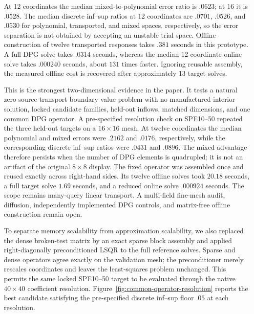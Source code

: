 \documentclass[11pt]{article}
\numberwithin{algorithm}{section}
\theoremstyle{definition}\newtheorem{definition}[theorem]{Definition}
\theoremstyle{remark}\newtheorem{remark}[theorem]{Remark}
\begin{document}
At 12 coordinates the median mixed-to-polynomial error ratio is $.0623$; at
16 it is $.0528$.  The median discrete inf--sup ratios at 12 coordinates are
$.0701$, $.0526$, and $.0530$ for polynomial, transported, and mixed spaces,
respectively, so the error separation is not obtained by accepting an unstable
trial space.  Offline construction of twelve transported responses takes
$.381$ seconds in this prototype.  A full DPG solve takes $.0314$ seconds,
whereas the median 12-coordinate online solve takes $.000240$ seconds, about
$131$ times faster.  Ignoring reusable assembly, the measured offline cost is
recovered after approximately 13 target solves.

This is the strongest two-dimensional evidence in the paper.  It tests a
natural zero-source transport boundary-value problem with no manufactured
interior solution, locked candidate families, held-out inflows, matched dimensions,
and one common DPG operator.  A pre-specified resolution check on SPE10--50
repeated the three held-out targets on a $16\times16$ mesh.  At twelve
coordinates the median polynomial and mixed errors were $.2162$ and $.0176$,
respectively, while the corresponding discrete inf--sup ratios were $.0431$
and $.0896$.  The mixed advantage therefore persists when the number of DPG
elements is quadrupled; it is not an artifact of the original $8\times8$
display.  The fixed operator was assembled once and reused exactly across
right-hand sides.  Its twelve offline solves took $20.18$ seconds, a full
target solve $1.69$ seconds, and a reduced online solve $.000924$ seconds.
The scope remains many-query linear transport.  A multi-field fine-mesh audit,
diffusion, independently implemented DPG controls, and matrix-free offline
construction remain open.

To separate memory scalability from approximation scalability, we also replaced
the dense broken-test matrix by an exact sparse block assembly and applied
right-diagonally preconditioned LSQR to the full reference solves.  Sparse and
dense operators agree exactly on the validation mesh; the preconditioner merely
rescales coordinates and leaves the least-squares problem unchanged.  This
permits the same locked SPE10--50 target to be evaluated through the native
$40\times40$ coefficient resolution.  Figure~\ref{fig:common-operator-resolution}
reports the best candidate satisfying the pre-specified discrete inf--sup floor
$.05$ at each resolution.
\end{document}
